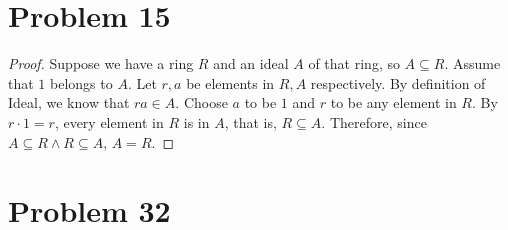 \documentclass[a4paper,12pt]{article}
\begin{document}
\section*{Problem 15}
\begin{proof}
  Suppose we have a ring $R$ and an ideal $A$ of that ring, so $A \subseteq R$. Assume that $1$ belongs to $A.$ Let $r,a$ be elements in $R,A$ respectively. By definition of Ideal, we know that $ra \in A.$ Choose $a$ to be $1$ and $r$ to be any element in $R$.  By $r \cdot 1 =r$, every element in $R$ is in $A$, that is, $R \subseteq A.$ Therefore, since $A \subseteq R \wedge R \subseteq A$, $A=R.$  
\end{proof}
\section*{Problem 32}
\end{document}
